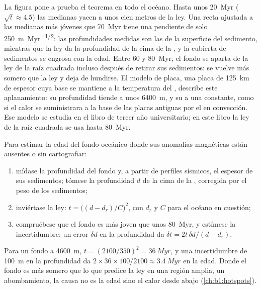 La figura pone a prueba el teorema en todo el océano. Hasta unos \qty{20}{Myr} ($\sqrt t \approx 4.5$) las medianas yacen a unos cien metros de
la ley. Una recta ajustada a las medianas más jóvenes que \qty{70}{Myr} tiene una pendiente de solo \qty{250}{m.Myr^{-1/2}}: las profundidades
medidas son las de la superficie del sedimento, mientras que la ley da la profundidad de la cima de la , y la cubierta de sedimentos
se engrosa con la edad. Entre 60 y \qty{80}{Myr}, el fondo se aparta de la ley de la raíz cuadrada incluso después de retirar sus
sedimentos: se vuelve más somero que la ley y deja de hundirse. El modelo de placa, una placa de \qty{125}{km} de espesor cuya base se
mantiene a la temperatura del , describe este aplanamiento: su profundidad tiende a unos \qty{6400}{m}, y su  a una
constante, como si el calor se suministrara a la base de las placas antiguas por el  en convección. Ese modelo se estudia en el libro
de tercer año universitario; en este libro la ley de la raíz cuadrada se usa hasta \qty{80}{Myr}.

\begin{method}\label{met:b1:rifts-ridges-margins:age-from-depth}
Para estimar la edad del fondo oceánico donde sus anomalías magnéticas están ausentes o sin cartografiar:
\begin{enumerate}
  \item mídase la profundidad del fondo y, a partir de perfiles sísmicos, el espesor de sus sedimentos; tómese la profundidad $d$ de la
        cima de la , corregida por el peso de los sedimentos;
  \item inviértase la ley: $t = \bigl((d - d_r)/C\bigr)^2$, con $d_r$ y $C$ para
        el océano en cuestión;
  \item compruébese que el fondo es más joven que unos \qty{80}{Myr}, y estímese la incertidumbre: un error $\delta d$ en la profundidad da
        $\delta t = 2t\,\delta d/(d - d_r)$.
\end{enumerate}
\end{method}

Para un fondo a \qty{4600}{m}, $t = (2100/350)^2 = \qty{36}{Myr}$, y una incertidumbre de \qty{100}{m} en la profundidad da $2\times36\times100/2100 \approx
\qty{3.4}{Myr}$ en la edad. Donde el fondo es más somero que lo que predice la ley en una región amplia, un abombamiento, la causa no es la edad sino el
calor desde abajo (\cref{ch:b1:hotspots}).

